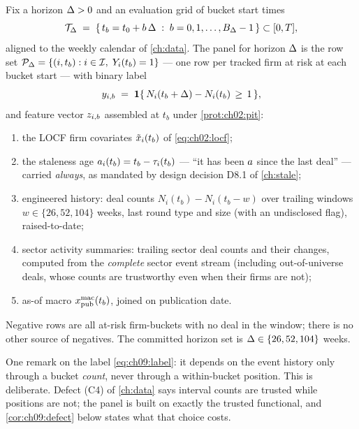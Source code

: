 \begin{definition}\label{def:ch09:panel}
Fix a horizon $\Delta > 0$ and an evaluation grid of bucket start times
\begin{equation}\label{eq:ch09:grid}
\mathcal{T}_{\Delta} \;=\; \{\, t_b = t_0 + b\,\Delta \;:\; b = 0, 1,
\dots, B_{\Delta}-1 \,\} \subset [0, T],
\end{equation}
aligned to the weekly calendar of \cref{ch:data}. The panel for horizon
$\Delta$ is the row set
$\mathcal{P}_{\Delta} = \{ (i, t_b) : i \in \mathcal{I},\; Y_i(t_b) = 1 \}$
--- one row per tracked firm at risk at each bucket start --- with binary
label
\begin{equation}\label{eq:ch09:label}
y_{i,b} \;=\; \mathbf{1}\{\, N_i(t_b + \Delta) - N_i(t_b) \,\ge\, 1 \,\},
\end{equation}
and feature vector $z_{i,b}$ assembled at $t_b$ under
\cref{prot:ch02:pit}:
\begin{enumerate}[label=(\roman*)]
\item the LOCF firm covariates $\tilde{x}_i(t_b)$ of
\cref{eq:ch02:locf};
\item the staleness age $a_i(t_b) = t_b - \tau_i(t_b)$ --- ``it
has been $a$ since the last deal'' --- carried \emph{always},
as mandated by design decision D8.1 of \cref{ch:stale};
\item engineered history: deal counts $N_i(t_b) - N_i(t_b - w)$ over
trailing windows $w \in \{26, 52, 104\}$ weeks, last round type and size
(with an undisclosed flag), raised-to-date;
\item sector activity summaries: trailing sector deal counts and their
changes, computed from the \emph{complete} sector event stream (including
out-of-universe deals, whose counts are trustworthy even when their firms
are not);
\item as-of macro $x^{\mathrm{mac}}_{\mathrm{pub}}(t_b)$, joined on
publication date.
\end{enumerate}
Negative rows are all at-risk firm-buckets with no deal in the window;
there is no other source of negatives. The committed horizon set is
$\Delta \in \{26, 52, 104\}$ weeks.
\end{definition}

One remark on the label \cref{eq:ch09:label}: it depends
on the event history only through a bucket \emph{count}, never through a
within-bucket position. This is deliberate. Defect (C4) of \cref{ch:data}
says interval counts are trusted while positions are not; the panel is
built on exactly the trusted functional, and \cref{cor:ch09:defect} below
states what that choice costs.


